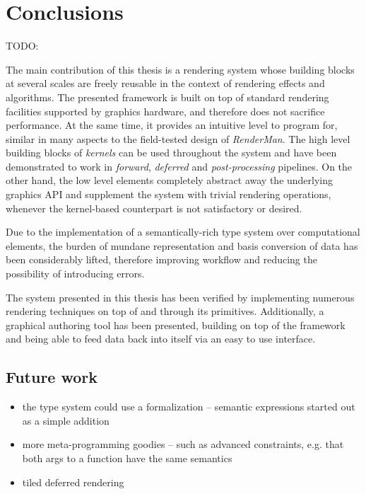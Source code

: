 
\chapter{ Conclusions }
\label{Chapter7}

TODO:

The main contribution of this thesis is a rendering system whose building blocks at several scales are freely reusable in the context of rendering effects and algorithms. The presented framework is built on top of standard rendering facilities supported by graphics hardware, and therefore does not sacrifice performance. At the same time, it provides an intuitive level to program for, similar in many aspects to the field-tested design of \emph{RenderMan}. The high level building blocks of \emph{kernels} can be used throughout the system and have been demonstrated to work in \emph{forward}, \emph{deferred} and \emph{post-processing} pipelines. On the other hand, the low level elements completely abstract away the underlying graphics API and supplement the system with trivial rendering operations, whenever the kernel-based counterpart is not satisfactory or desired.

Due to the implementation of a semantically-rich type system over computational elements, the burden of mundane representation and basis conversion of data has been considerably lifted, therefore improving workflow and reducing the possibility of introducing errors.

The system presented in this thesis has been verified by implementing numerous rendering techniques on top of and through its primitives. Additionally, a graphical authoring tool has been presented, building on top of the framework and being able to feed data back into itself via an easy to use interface.

\section{Future work}

\begin{itemize}
\item the type system could use a formalization -- semantic expressions started out as a simple addition
\item more meta-programming goodies -- such as advanced constraints, e.g. that both args to a function have the same semantics
\item tiled deferred rendering
\end{itemize}
